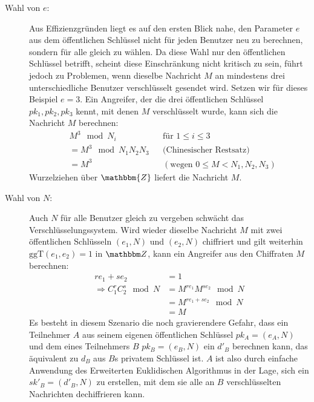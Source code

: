 \begin{description}
    \item[Wahl von $e$:] Aus Effizienzgründen liegt es auf den ersten Blick nahe, den Parameter $e$ aus dem öffentlichen Schlüssel nicht für jeden Benutzer neu
    zu berechnen, sondern für alle gleich zu wählen. Da diese Wahl nur den öffentlichen Schlüssel betrifft, scheint diese Einschränkung nicht kritisch zu sein,
    führt jedoch zu Problemen, wenn dieselbe Nachricht $M$ an mindestens drei unterschiedliche Benutzer verschlüsselt gesendet wird. Setzen wir für dieses Beispiel $e =
    3$. Ein Angreifer, der die drei öffentlichen Schlüssel $pk_1, pk_2, pk_3$ kennt, mit denen $M$ verschlüsselt wurde, kann sich die Nachricht $M$ berechnen:
    \begin{align*}
    & M^3 \mod N_i  && \text{für } 1 \leq i \leq 3\\
    &= M^3 \mod N_1N_2N_3  && \text{(Chinesischer Restsatz)}\\
    &= M^3 && (\text{wegen } 0 \leq M < N_1,N_2,N_3)
    \end{align*}
    Wurzelziehen über $\mathbbm{Z}$ liefert die Nachricht $M$.
    
    \item[Wahl von $N$:] Auch $N$ für alle Benutzer gleich zu vergeben schwächt das Verschlüsselungssystem. Wird wieder dieselbe Nachricht $M$ mit zwei
    öffentlichen Schlüsseln $(e_1, N)$ und $(e_2, N)$ chiffriert und gilt weiterhin $\text{ggT}(e_1, e_2) = 1$ in $\Z{}$, kann ein Angreifer aus den Chiffraten
    $M$ berechnen:
    \begin{align*}
    re_1 + se_2 & = 1\\ 
    \Longrightarrow C_1^rC_2^s \mod N &= M^{re_1}M^{se_2} \mod N\\
    &= M^{re_1 + se_2} \mod N\\
    &= M
    \end{align*}
    Es besteht in diesem Szenario die noch gravierendere Gefahr, dass ein Teilnehmer $A$ aus seinem eigenen öffentlichen Schlüssel $pk_A = (e_A, N)$ und
    dem eines Teilnehmers $B$ $pk_B = (e_B, N)$ ein $d'_B$ berechnen kann, das äquivalent zu $d_B$ aus $B$s privatem Schlüssel ist. $A$ ist also durch einfache
    Anwendung des Erweiterten Euklidischen Algorithmus in der Lage, sich ein $sk'_B = (d'_B, N)$ zu erstellen, mit dem sie alle an $B$ verschlüsselten    
    Nachrichten dechiffrieren kann.
    

\end{description}
